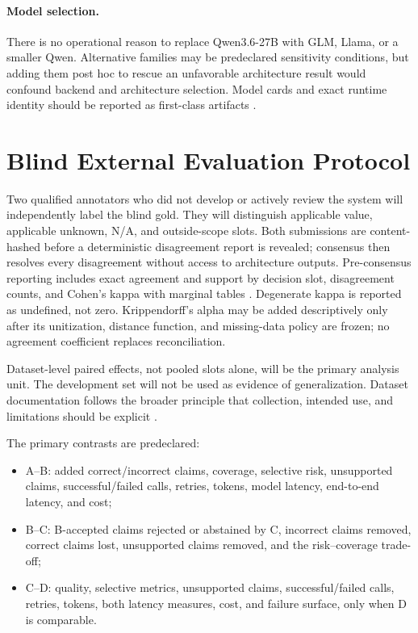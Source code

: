 \documentclass[11pt]{article}
\newcommand{\NA}{\textsf{N/A}}
\begin{document}
\paragraph{Model selection.}
There is no operational reason to replace Qwen3.6-27B with GLM, Llama, or a smaller
Qwen. Alternative families may be predeclared sensitivity conditions, but adding
them post hoc to rescue an unfavorable architecture result would confound backend
and architecture selection. Model cards and exact runtime identity should be
reported as first-class artifacts \cite{mitchell2019modelcards}.

\section{Blind External Evaluation Protocol}

Two qualified annotators who did not develop or actively review the system will
independently label the blind gold. They will distinguish applicable value,
applicable unknown, \NA, and outside-scope slots. Both submissions are
content-hashed before a deterministic disagreement report is revealed; consensus
then resolves every disagreement without access to architecture outputs.
Pre-consensus reporting includes exact agreement and support by decision slot,
disagreement counts, and Cohen's kappa with marginal tables
\cite{cohen1960kappa}. Degenerate kappa is reported as undefined, not zero.
Krippendorff's alpha \cite{krippendorff2018content} may be added descriptively
only after its unitization, distance function, and missing-data policy are frozen;
no agreement coefficient replaces reconciliation.

Dataset-level paired effects, not pooled slots alone, will be the primary analysis
unit. The development set will not be used as evidence of generalization. Dataset
documentation follows the broader principle that collection, intended use, and
limitations should be explicit \cite{gebru2021datasheets}.

The primary contrasts are predeclared:
\begin{itemize}
  \item A--B: added correct/incorrect claims, coverage, selective risk, unsupported claims, successful/failed calls, retries, tokens, model latency, end-to-end latency, and cost;
  \item B--C: B-accepted claims rejected or abstained by C, incorrect claims removed, correct claims lost, unsupported claims removed, and the risk--coverage trade-off;
  \item C--D: quality, selective metrics, unsupported claims, successful/failed calls, retries, tokens, both latency measures, cost, and failure surface, only when D is comparable.
\end{itemize}
\end{document}
